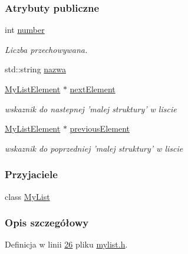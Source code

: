 \subsubsection*{Atrybuty publiczne}
\begin{DoxyCompactItemize}
\item 
int \hyperlink{class_my_list_1_1_my_list_element_acd6dbb6a8791f034f94678d46395b366}{number}
\begin{DoxyCompactList}\small\item\em Liczba przechowywana. \end{DoxyCompactList}\item 
std\-::string \hyperlink{class_my_list_1_1_my_list_element_af610aeae835150be1a12d538e67a579c}{nazwa}
\item 
\hyperlink{class_my_list_1_1_my_list_element}{My\-List\-Element} $\ast$ \hyperlink{class_my_list_1_1_my_list_element_abd7af673552c8876f210cbea01c5e949}{next\-Element}
\begin{DoxyCompactList}\small\item\em wskaznik do nastepnej 'malej struktury' w liscie \end{DoxyCompactList}\item 
\hyperlink{class_my_list_1_1_my_list_element}{My\-List\-Element} $\ast$ \hyperlink{class_my_list_1_1_my_list_element_adb7c0cbde93a90f30484637498690d0f}{previous\-Element}
\begin{DoxyCompactList}\small\item\em wskaznik do poprzedniej 'malej struktury' w liscie \end{DoxyCompactList}\end{DoxyCompactItemize}
\subsubsection*{Przyjaciele}
\begin{DoxyCompactItemize}
\item 
class \hyperlink{class_my_list_1_1_my_list_element_a3aca1c680e3cc534773a005bb24bfed4}{My\-List}
\end{DoxyCompactItemize}


\subsubsection{Opis szczegółowy}


Definicja w linii \hyperlink{mylist_8h_source_l00026}{26} pliku \hyperlink{mylist_8h_source}{mylist.\-h}.



